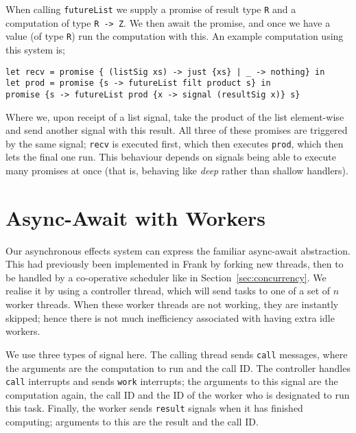 \documentclass[msc,deptreport,cs]{infthesis} %
\newcommand{\code}[1]{\lstinline{#1}}
\newcommand{\todo}[1]
           {{\par\noindent\small\color{RoyalPurple}
  \framebox{\parbox{\dimexpr\linewidth-2\fboxsep-2\fboxrule}
    {\textbf{TODO:} #1}}}}
\begin{document}
\noindent When calling \code{futureList} we supply a promise of result type
\code{R} and a computation of type \code{R -> Z}. We then await the promise, and
once we have a value (of type \code{R}) run the computation with this. An
example computation using this system is;

\begin{lstlisting}
let recv = promise { (listSig xs) -> just {xs} | _ -> nothing} in
let prod = promise {s -> futureList filt product s} in
promise {s -> futureList prod {x -> signal (resultSig x)} s}
\end{lstlisting}

\noindent Where we, upon receipt of a list signal, take the product of the list
element-wise and send another signal with this result. All three of these
promises are triggered by the same signal; \code{recv} is executed first, which
then executes \code{prod}, which then lets the final one run. This behaviour
depends on signals being able to execute many promises at once (that is,
behaving like \emph{deep} rather than shallow handlers).

\section{Async-Await with Workers}
\label{sec:async-await}

Our asynchronous effects system can express the familiar async-await
abstraction. This had previously been implemented in Frank by forking new
threads, then to be handled by a co-operative scheduler like in
Section~\ref{sec:concurrency}. We realise it by using a controller thread, which
will send tasks to one of a set of $n$ worker threads. When these worker threads
are not working, they are instantly skipped; hence there is not much
inefficiency associated with having extra idle workers.

We use three types of signal here. The calling thread sends \code{call}
messages, where the arguments are the computation to run and the call ID. The
controller handles \code{call} interrupts and sends \code{work} interrupts; the
arguments to this signal are the computation again, the call ID and the ID of
the worker who is designated to run this task. Finally, the worker sends
\code{result} signals when it has finished computing; arguments to this are the
result and the call ID.


\end{document}
